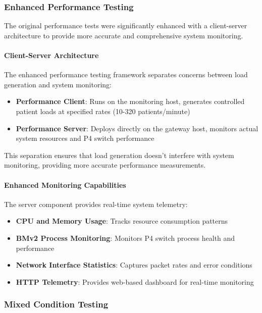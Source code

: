 \subsubsection{Enhanced Performance Testing}

The original performance tests were significantly enhanced with a client-server architecture to provide more accurate and comprehensive system monitoring.

\paragraph{Client-Server Architecture}
The enhanced performance testing framework separates concerns between load generation and system monitoring:

\begin{itemize}
    \item \textbf{Performance Client}: Runs on the monitoring host, generates controlled patient loads at specified rates (10-320 patients/minute)
    \item \textbf{Performance Server}: Deploys directly on the gateway host, monitors actual system resources and P4 switch performance
\end{itemize}

This separation ensures that load generation doesn't interfere with system monitoring, providing more accurate performance measurements.

\paragraph{Enhanced Monitoring Capabilities}
The server component provides real-time system telemetry:

\begin{itemize}
    \item \textbf{CPU and Memory Usage}: Tracks resource consumption patterns
    \item \textbf{BMv2 Process Monitoring}: Monitors P4 switch process health and performance
    \item \textbf{Network Interface Statistics}: Captures packet rates and error conditions
    \item \textbf{HTTP Telemetry}: Provides web-based dashboard for real-time monitoring
\end{itemize}

\subsubsection{Mixed Condition Testing}

